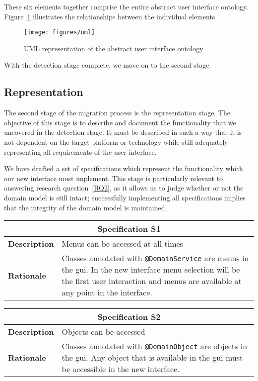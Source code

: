 These six elements together comprise the entire abstract user interface ontology. Figure~\ref{figure:uml} illustrates the relationships between the individual elements.

\begin{figure}
	\center
	\texttt{[image: figures/uml]}
	\caption{UML representation of the abstract user interface ontology}
	\label{figure:uml}
\end{figure}

With the detection stage complete, we move on to the second stage.

\subsection{Representation}
\label{subsection:representation}
The second stage of the migration process is the representation stage. The objective of this stage is to describe and document the functionality that we uncovered in the detection stage. It must be described in such a way that it is not dependent on the target platform or technology while still adequately representing all requirements of the user interface.

We have drafted a set of specifications which represent the functionality which our new interface must implement. This stage is particularly relevant to answering research question~\ref{RQ2}, as it allows us to judge whether or not the domain model is still intact; successfully implementing all specifications implies that the integrity of the domain model is maintained.

\newpage
\noindent
\small

\begin{tabularx}{0.49\textwidth}[t]{lX}
	\toprule
	\multicolumn{2}{c}{\textbf{Specification S1}} \\
	\midrule
	\textbf{Description} & Menus can be accessed at all times \\
	\addlinespace[0.5em]
	\textbf{Rationale}	 & Classes annotated with \texttt{@DomainService} are menus in the \acrshort{gui}. In the new interface menu selection will be the first user interaction and menus are available at any point in the interface. \\
	\bottomrule
\end{tabularx}\hspace{0.02\textwidth}
\begin{tabularx}{0.49\textwidth}[t]{lX}
	\toprule
	\multicolumn{2}{c}{\textbf{Specification S2}} \\
	\midrule
	\textbf{Description} & Objects can be accessed \newline \\
	\addlinespace[0.5em]
	\textbf{Rationale}	 & Classes annotated with \texttt{@DomainObject} are objects in the \acrshort{gui}. Any object that is available in the \acrshort{gui} must be accessible in the new interface. \newline \newline \\
	\bottomrule
\end{tabularx}
\\[1em]

